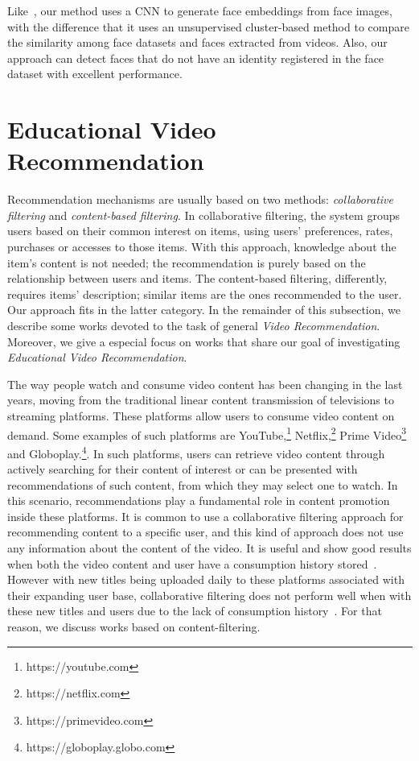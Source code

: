 Like~\cite{globofacestream, yang2017neural, rao2017attention, sohn2017unsupervised}, our method uses a CNN to generate face embeddings from face images, with the difference that it uses an unsupervised cluster-based method to compare the similarity among face datasets and faces extracted from videos. Also, our approach can detect faces that do not have an identity registered in the face dataset with excellent performance.

\section{Educational Video Recommendation}
\label{sec:recommendation}

Recommendation mechanisms are usually based on two methods: \textit{collaborative filtering} and \textit{content-based filtering}. 
In collaborative filtering, the system groups users based on their common interest on items, using users' preferences, rates, purchases or accesses to those items. With this approach, 
knowledge about the item's content is not needed; the recommendation is purely based on the relationship between users and items.  The content-based filtering, differently, requires items' description; similar items are the ones recommended to the user. Our approach fits in the latter category. In the remainder of this subsection, we describe some works devoted to the task of general \emph{Video Recommendation}. Moreover, we give a especial focus on works that share our goal of investigating \emph{Educational Video Recommendation}.

The way people watch and consume video content has been changing in the last years, moving from the traditional linear content transmission of  televisions to streaming platforms. These platforms allow users to consume video content on demand. Some examples of such platforms are YouTube,\footnote{https://youtube.com} Netflix,\footnote{https://netflix.com} Prime Video\footnote{https://primevideo.com} and Globoplay.\footnote{https://globoplay.globo.com}. In such platforms, users can retrieve video content through actively searching for their content of interest or can be presented with recommendations of such content, from which they may select one to watch. 
In this scenario, recommendations play a fundamental role in content promotion inside these platforms. It is common to use a collaborative filtering approach for recommending content to a specific user, and this kind of approach does not use any information about the content of the video. It is useful and show good results when both the video content and user have a consumption history stored~\cite{ferreira2020investigating}. 
However with new titles being uploaded daily to these platforms associated with their expanding user base, collaborative filtering does not perform well when with these new titles and users due to the lack of consumption history~\cite{suvash14social}. For that reason, we discuss works based on content-filtering.



